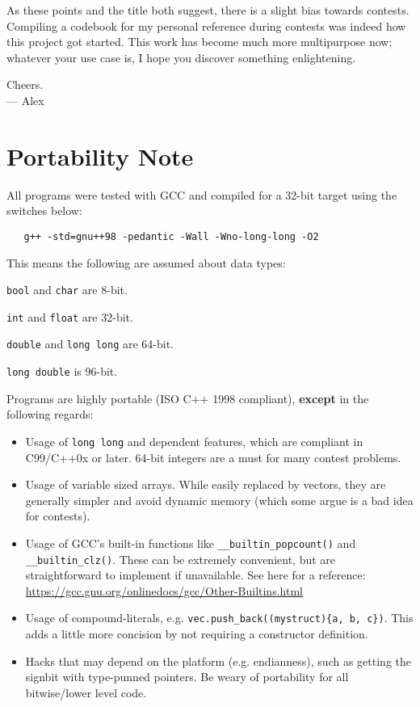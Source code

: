 \documentclass[11pt,letterpaper,twoside]{book}
\begin{document}
As these points and the title both suggest, there is a slight bias towards contests. Compiling a codebook for my personal reference during contests was indeed how this project got started. This work has become much more multipurpose now; whatever your use case is, I hope you discover something enlightening.

\begin{flushright}
Cheers.\\
--- Alex\\[0.3\baselineskip]
\end{flushright}

\section*{Portability Note}

All programs were tested with GCC and compiled for a 32-bit target using the switches below:

\begin{verbatim}
   g++ -std=gnu++98 -pedantic -Wall -Wno-long-long -O2
\end{verbatim}

This means the following are assumed about data types:

\begin{compactitem}
	\item \texttt{bool} and \texttt{char} are 8-bit.
	\item \texttt{int} and \texttt{float} are 32-bit.
	\item \texttt{double} and \texttt{long long} are 64-bit.
	\item \texttt{long double} is 96-bit.
\end{compactitem}
\vspace{5pt}

Programs are highly portable (ISO C++ 1998 compliant), \textbf{except} in the following regards:

\begin{itemize}
	\item Usage of \texttt{long long} and dependent features, which are compliant in C99/C++0x or later. 64-bit integers are a must for many contest problems.
	\item Usage of variable sized arrays. While easily replaced by vectors, they are generally simpler and avoid dynamic memory (which some argue is a bad idea for contests).
	\item Usage of GCC's built-in functions like \texttt{\_\_builtin\_popcount()} and \texttt{\_\_builtin\_clz()}. These can be extremely convenient, but are straightforward to implement if unavailable. See here for a reference: \url{https://gcc.gnu.org/onlinedocs/gcc/Other-Builtins.html}
	\item Usage of compound-literals, e.g. \texttt{vec.push\_back((mystruct)\{a, b, c\})}. This adds a little more concision by not requiring a constructor definition.
	\item Hacks that may depend on the platform (e.g. endianness), such as getting the signbit with type-punned pointers. Be weary of portability for all bitwise/lower level code.
\end{itemize}

\tableofcontents

\mainmatter







\backmatter

\printindex
\end{document}
